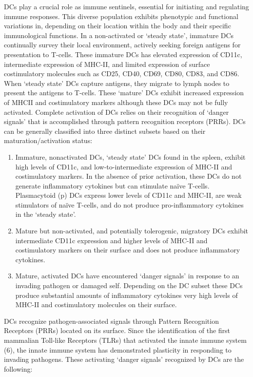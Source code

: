 \documentclass[
]{article}
\begin{document}
DCs play a crucial role as immune sentinels, essential for initiating
and regulating immune responses. This diverse population exhibits
phenotypic and functional variations in, depending on their location
within the body and their specific immunological functions. In a
non-activated or `steady state', immature DCs continually survey their
local environment, actively seeking foreign antigens for presentation to
T-cells. These immature DCs has elevated expression of CD11c,
intermediate expression of MHC-II, and limited expression of surface
costimulatory molecules such as CD25, CD40, CD69, CD80, CD83, and CD86.
When `steady state' DCs capture antigens, they migrate to lymph nodes to
present the antigens to T-cells. These `mature' DCs exhibit increased
expression of MHCII and costimulatory markers although these DCs may not
be fully activated. Complete activation of DCs relies on their
recognition of `danger signals' that is accomplished through pattern
recognition receptors (PRRs). DCs can be generally classified into three
distinct subsets based on their maturation/activation status:

\begin{enumerate}
\def\labelenumi{\arabic{enumi}.}
\item
  Immature, nonactivated DCs, `steady state' DCs found in the spleen,
  exhibit high levels of CD11c, and low-to-intermediate expression of
  MHC-II and costimulatory markers. In the absence of prior activation,
  these DCs do not generate inflammatory cytokines but can stimulate
  naïve T-cells. Plasmacytoid (p) DCs express lower levels of CD11c and
  MHC-II, are weak stimulators of naïve T-cells, and do not produce
  pro-inflammatory cytokines in the `steady state'.
\item
  Mature but non-activated, and potentially tolerogenic, migratory DCs
  exhibit intermediate CD11c expression and higher levels of MHC-II and
  costimulatory markers on their surface and does not produce
  inflammatory cytokines.
\item
  Mature, activated DCs have encountered `danger signals' in response to
  an invading pathogen or damaged self. Depending on the DC subset these
  DCs produce substantial amounts of inflammatory cytokines very high
  levels of MHC-II and costimulatory molecules on their surface.
\end{enumerate}

DCs recognize pathogen-associated signals through Pattern Recognition
Receptors (PRRs) located on its surface. Since the identification of the
first mammalian Toll-like Receptors (TLRs) that activated the innate
immune system (6), the innate immune system has demonstrated plasticity
in responding to invading pathogens. These activating `danger signals'
recognized by DCs are the following:
\end{document}
